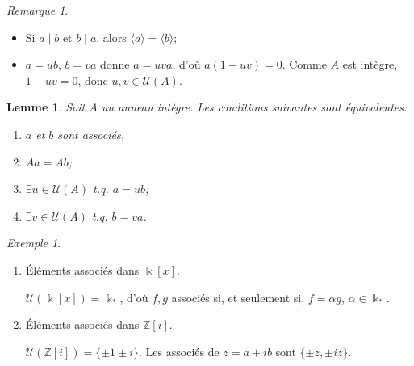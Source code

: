 \documentclass{report}
\newtheorem*{lem}{Lemme}
\theoremstyle{definition}
\theoremstyle{remark}
\newtheorem*{exem}{Exemple}
\newtheorem*{rmq}{Remarque}
\def\ZZ{\mathbb{Z}}
\begin{document}
	\begin{rmq}~

		\begin{itemize}
			\item Si $a\mid b$ et $b\mid a$, alors $\langle a \rangle = \langle b \rangle$;
			\item $a=ub$, $b=va$ donne $a=uva$, d'o\`u $a(1-uv)=0$. Comme $A$ est int\`egre, $1-uv=0$, donc $u,v\in\mathcal{U}(A)$.
		\end{itemize}
	\end{rmq}

	\begin{lem}
		Soit $A$ un anneau int\`egre. Les conditions suivantes sont \'equivalentes:
		\begin{enumerate}
			\item $a$ et $b$ sont associ\'es,
			\item $Aa=Ab$;
			\item $\exists u\in\mathcal{U}(A)$ t.q. $a=ub$;
			\item $\exists v\in\mathcal{U}(A)$ t.q. $b=va$.
		\end{enumerate}
	\end{lem}

	\begin{exem}
		\begin{enumerate}
			\item \'El\'ements associ\'es dans $\Bbbk[x]$.

			$\mathcal{U}(\Bbbk[x])=\Bbbk_*$, d'o\`u $f,g$ associ\'es si, et seulement si, $f=\alpha g$, $\alpha\in\Bbbk_*$.
			\item \'El\'ements associ\'es dans $\ZZ[i]$.

			$\mathcal{U}(\ZZ[i])=\{\pm1\pm i\}$. Les associ\'es de $z=a+ib$ sont $\{\pm z,\pm iz\}$.
		\end{enumerate}
	\end{exem}
\end{document}
